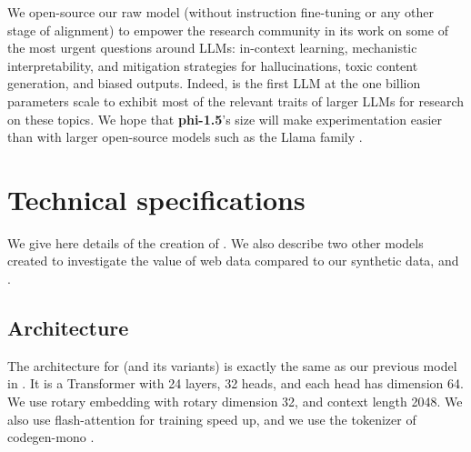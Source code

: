 We open-source our raw \phionenlnointer model (without instruction fine-tuning or any other stage of alignment) to empower the research community in its work on some of the most urgent questions around LLMs: in-context learning, mechanistic interpretability, and mitigation strategies for hallucinations, toxic content generation, and biased outputs. Indeed, \phionenlnointer is the first LLM at the one billion parameters scale to exhibit most of the relevant traits of larger LLMs for research on these topics. We hope that \textbf{phi-1.5}'s size will make experimentation easier than with larger open-source models such as the Llama family \cite{touvron2023llama}.
 \vspace{-3pt}
\begin{table}[h]
\centering
{}
\caption{Comparison of compute of different models using a single A100-80G with context length 2048 and fp16.\label{tab:my_label}} %
\end{table}

\section{Technical specifications}
We give here details of the creation of \phionenlnointer\!. We also describe two other models created to investigate the value of web data compared to our synthetic data, \phionenlbase and \phionenl\!.

\subsection{Architecture} 
The architecture for {\phionepointfive } (and its variants) is exactly the same as our previous model \phione in \cite{gunasekar2023textbooks}. It is a Transformer \cite{Vas17} with 24 layers, 32 heads, and each head has dimension 64. We use rotary embedding with rotary dimension 32, and context length 2048.  We also use flash-attention  \cite{dao2022flashattention,dao2023flashattention2} for training speed up, and we use the tokenizer of codegen-mono \cite{codegen}. %

